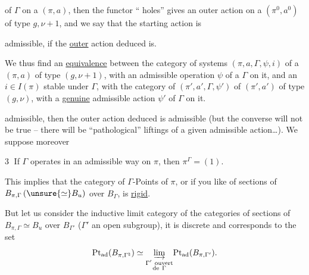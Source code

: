 of $\Gamma$ on a $(\pi,a)$, then the functor
 `` holes'' gives an outer
action on a $(\pi^0,a^0)$ of type $g,\nu+1$,
and we say that the starting action is


admissible, if the \uline{outer} action deduced is.

We thus find an \uline{equivalence} between
the category of  systems $(\pi,a,\Gamma,\psi,i)$
of a $(\pi,a)$ of type $(g,\nu+1)$, with an
admissible  operation $\psi$ of a $\Gamma$ on it, and
an $i\in I(\pi)$ stable under $\Gamma$, with the category
of $(\pi',a',\Gamma,\psi')$ of $(\pi',a')$ of type
$(g,\nu)$, with a \uline{genuine} admissible action $\psi'$
of $\Gamma$ on it.

admissible, then the outer action deduced
is admissible (but the converse will
not be true -- there will be ``pathological''
liftings of a given admissible  action\ldots). We suppose moreover

\textcircled{3} If $\Gamma$ operates  in an admissible way on
$\pi$, then $\pi^\Gamma=(1)$.

This implies that the category of
$\Gamma$-Points of $\pi$, or if you like of sections
of $B_{\pi,\Gamma}\,(\unsure{\simeq}B_u)$ over $B_\Gamma$, is \uline{rigid}.


But  let us consider the inductive limit category of the  categories of sections of $B_{\pi,\Gamma}\simeq B_u$ over $B_{\Gamma'}$ ($\Gamma'$ an open subgroup), it is discrete and corresponds to the set
\[
\mathrm{Pt}_{\mathrm{ad}}(B_{\pi,\Gamma^{\natural}})\simeq
\underset{\substack{\Gamma'\ \mathrm{ouvert}\\\mathrm{de}\ \Gamma}}{\varinjlim}
\mathrm{Pt}_{\mathrm{ad}}(B_{\pi,\Gamma'}).
\]

